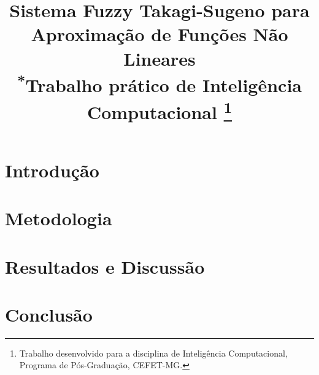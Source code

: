 \documentclass[conference]{IEEEtran}
\begin{document}
\title{Sistema Fuzzy Takagi-Sugeno para Aproximação de Funções Não Lineares\\
{\footnotesize \textsuperscript{*}Trabalho prático de Inteligência Computacional}
\thanks{Trabalho desenvolvido para a disciplina de Inteligência Computacional, Programa de Pós-Graduação, CEFET-MG.}
}

\author{
\and
{}
}

\maketitle

\renewcommand{\abstractname}{Resumo}
\begin{abstract}

\end{abstract}

\renewcommand{\IEEEkeywordsname}{Palavras-chave}
\begin{IEEEkeywords}

\end{IEEEkeywords}

\section{Introdução}


\section{Metodologia}




\section{Resultados e Discussão}


\section{Conclusão}


\renewcommand{\refname}{Referências}


\end{document}
